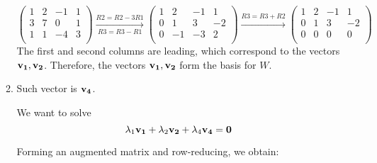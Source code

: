 \begin{enumerate}
\begin{enumerate}
                \begin{math}
                    \begin{pmatrix}
                        1 & 2 & -1 & 1 \\
                        3 & 7 &  0 & 1 \\
                        1 & 1 & -4 & 3 \\
                    \end{pmatrix}
                    \xrightarrow[R3 = R3 - R1]{R2 = R2 - 3R1}
                    \begin{pmatrix}
                        1 &  2 & -1 &  1 \\
                        0 &  1 &  3 & -2 \\
                        0 & -1 & -3 &  2 \\
                    \end{pmatrix}
                    \xrightarrow{R3 = R3 + R2}
                    \begin{pmatrix}
                        1 &  2 & -1 &  1 \\
                        0 &  1 &  3 & -2 \\
                        0 &  0 &  0 &  0 \\
                    \end{pmatrix}
                \end{math} \\[5mm]

                The first and second columns are leading, which
                correspond to the vectors $\mathbf{v_1}, \mathbf{v_2}$.
                Therefore, the vectors $\mathbf{v_1}, \mathbf{v_2}$ form the basis
                for $W$.

            \item
                Such vector is $\mathbf{v_4}$.

                We want to solve
                $$\lambda_1 \mathbf{v_1} + \lambda_2 \mathbf{v_2} + \lambda_4 \mathbf{v_4} = \mathbf{0}$$

                Forming an augmented matrix and row-reducing, we obtain: \\[5mm]


\end{enumerate}
\end{enumerate}

